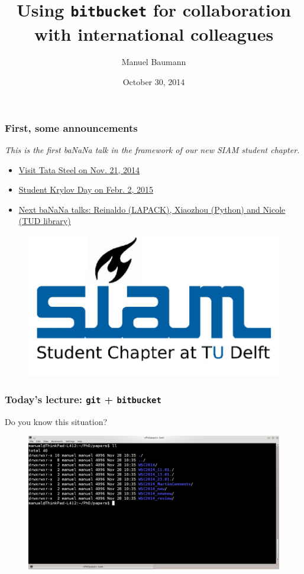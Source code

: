 \documentclass{beamer}
\title{\huge{Using \texttt{bitbucket} for collaboration with international colleagues}}
\author{Manuel Baumann}
\date{\footnotesize{October 30, 2014}}
\begin{document}
\frame{
\titlepage
}

\begin{frame}
\frametitle{First, some announcements}
\vspace{1cm}
\textit{This is the first ba\color{red}NaN\color{black}a talk in the framework of our new SIAM student chapter.}
\begin{itemize}
 \item \href{http://sscdelft.github.io/activities/2014/11/21/visit-tata-steel.html}{Visit Tata Steel on Nov. 21, 2014}
 \pause
 \item \href{http://sscdelft.github.io/activities/2015/02/02/krylov-day.html}{Student Krylov Day on Febr. 2, 2015}
 \pause
 \item \href{http://projectbanana.github.io/}{Next ba\color{red}NaN\color{black}a talks: Reinaldo (LAPACK), Xiaozhou (Python) and Nicole (TUD library)}
\end{itemize}
\begin{figure}
\hfill \includegraphics[scale=0.12]{images/SSC_Delft_new}
\end{figure}

\end{frame}

\begin{frame}
\frametitle{Today's lecture: \texttt{git} + \texttt{bitbucket}}
Do you know this situation?
\begin{figure}
\centering
 \includegraphics[height=0.6\textheight]{images/screnshot1.png}
\end{figure}
\end{frame}
\end{document}
